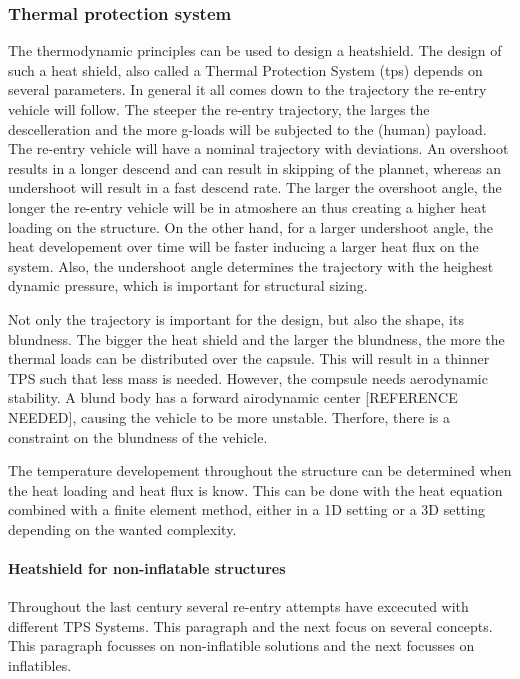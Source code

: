 \subsubsection{Thermal protection system}
The thermodynamic principles can be used to design a heatshield. The design of such a heat shield, also called a Thermal Protection System (\gls{tps}) depends on several parameters. In general it all comes down to the trajectory the re-entry vehicle will follow. The steeper the re-entry trajectory, the larges the descelleration and the more g-loads will be subjected to the (human) payload. The re-entry vehicle will have a nominal trajectory with deviations. An overshoot results in a longer descend and can result in skipping of the plannet, whereas an undershoot will result in a fast descend rate. The larger the overshoot angle, the longer the re-entry vehicle will be in atmoshere an thus creating a higher heat loading on the structure. On the other hand, for a larger undershoot angle, the heat developement over time will be faster inducing a larger heat flux on the system. Also, the undershoot angle determines the trajectory with the heighest dynamic pressure, which is important for structural sizing. 

Not only the trajectory is important for the design, but also the shape, its blundness. The bigger the heat shield and the larger the blundness, the more the  thermal loads can be distributed over the capsule. This will result in a thinner TPS such that less mass is needed. However, the compsule needs aerodynamic stability. A blund body has a forward airodynamic center [REFERENCE NEEDED], causing the vehicle to be more unstable. Therfore, there is a constraint on the blundness of the vehicle.

The temperature developement throughout the structure can be determined when the heat loading and heat flux is know. This can be done with the heat equation combined with a finite element method, either in a 1D setting or a 3D setting depending on the wanted complexity.

\paragraph{Heatshield for non-inflatable structures}
Throughout the last century several re-entry attempts have excecuted with different TPS Systems. This paragraph and the next focus on several concepts. This paragraph focusses on non-inflatible solutions and the next focusses on inflatibles. 

